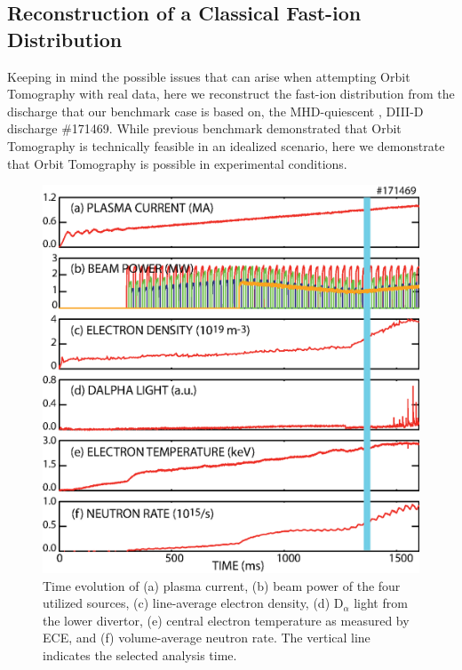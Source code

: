 \subsection{Reconstruction of a Classical Fast-ion Distribution}
Keeping in mind the possible issues that can arise when attempting Orbit Tomography with real data, here we reconstruct the fast-ion distribution from the discharge that our benchmark case is based on, the MHD-quiescent , DIII-D discharge \#171469. While previous benchmark demonstrated that Orbit Tomography is technically feasible in an idealized scenario, here we demonstrate that Orbit Tomography is possible in experimental conditions.

\begin{figure}[h!]
    \centering
    \includegraphics[width=16cm]{figures/171469_plasma.eps}
    \caption{Time evolution of (a) plasma current, (b) beam power of the four utilized sources, (c) line-average electron density, (d) D$_\alpha$ light from the lower divertor, (e) central electron temperature as measured by ECE, and (f) volume-average neutron rate. The vertical line indicates the selected analysis time.}
    \label{fig:d3d_plasma}
\end{figure}
